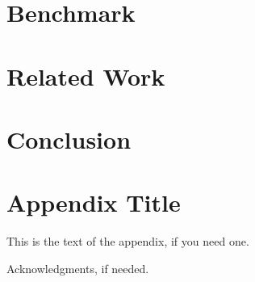 \documentclass{sigplanconf}
\begin{document}
\section{Benchmark}  

\section{Related Work}

\section{Conclusion}


\appendix
\section{Appendix Title}

This is the text of the appendix, if you need one.

\acks

Acknowledgments, if needed.


\makeatletter
  \def\@seccntformat#1{Appendix~\csname the#1\endcsname:\quad}
\makeatother




\end{document}
